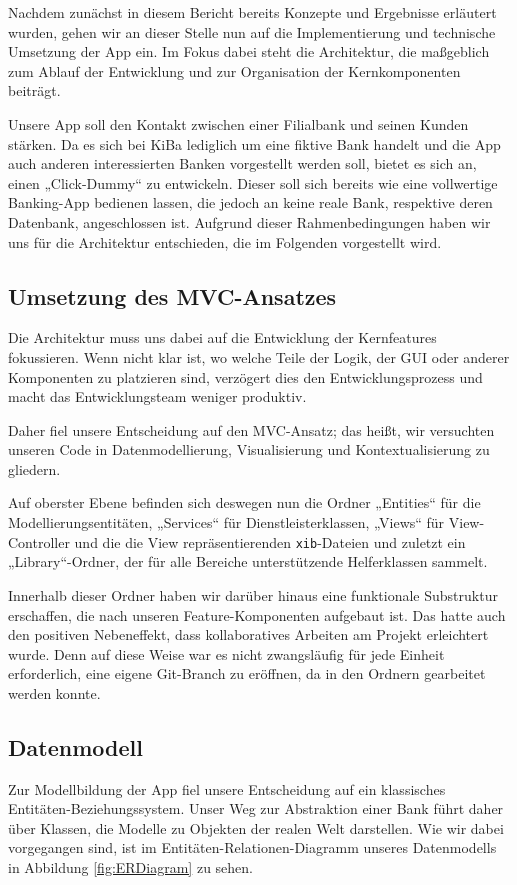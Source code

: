 	Nachdem zunächst in diesem Bericht bereits Konzepte und Ergebnisse erläutert wurden, gehen wir an dieser Stelle nun auf die Implementierung und technische Umsetzung der App ein. Im Fokus dabei steht die Architektur, die maßgeblich zum Ablauf der Entwicklung und zur Organisation der Kernkomponenten beiträgt.
	
	Unsere App soll den Kontakt zwischen einer Filialbank und seinen Kunden stärken. Da es sich bei KiBa lediglich um eine fiktive Bank handelt und die App auch anderen interessierten Banken vorgestellt werden soll, bietet es sich an, einen „Click-Dummy“ zu entwickeln. Dieser soll sich bereits wie eine vollwertige Banking-App bedienen lassen, die jedoch an keine reale Bank, respektive deren Datenbank, angeschlossen ist. Aufgrund dieser Rahmenbedingungen haben wir uns für die Architektur entschieden, die im Folgenden vorgestellt wird.

\subsection{Umsetzung des MVC-Ansatzes}
	Die Architektur muss uns dabei auf die Entwicklung der Kernfeatures fokussieren. Wenn nicht klar ist, wo welche Teile der Logik, der GUI oder anderer Komponenten zu platzieren sind, verzögert dies den Entwicklungsprozess und macht das Entwicklungsteam weniger produktiv.
	
	Daher fiel unsere Entscheidung auf den MVC-Ansatz; das heißt, wir versuchten unseren Code in Datenmodellierung, Visualisierung und Kontextualisierung zu gliedern.
	
	Auf oberster Ebene befinden sich deswegen nun die Ordner „Entities“ für die Modellierungsentitäten, „Services“ für Dienstleisterklassen, „Views“ für View-Controller und die die View repräsentierenden \texttt{xib}-Dateien und zuletzt ein „Library“-Ordner, der für alle Bereiche unterstützende Helferklassen sammelt.
	
	Innerhalb dieser Ordner haben wir darüber hinaus eine funktionale Substruktur erschaffen, die nach unseren Feature-Komponenten aufgebaut ist. Das hatte auch den positiven Nebeneffekt, dass kollaboratives Arbeiten am Projekt erleichtert wurde. Denn auf diese Weise war es nicht zwangsläufig für jede Einheit erforderlich, eine eigene Git-Branch zu eröffnen, da in den Ordnern gearbeitet werden konnte.

\subsection{Datenmodell}	
	Zur Modellbildung der App fiel unsere Entscheidung auf ein klassisches Entitäten-Be\-zieh\-ungs\-sys\-tem. Unser Weg zur Abstraktion einer Bank führt daher	über Klassen, die Modelle zu Objekten der realen Welt darstellen. Wie wir dabei vorgegangen sind, ist im Entitäten-Relationen-Diagramm unseres Datenmodells in Abbildung \ref{fig:ERDiagram} zu sehen.
	
